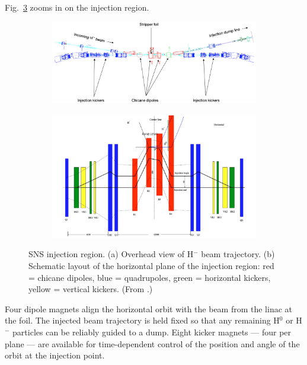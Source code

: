 Fig.~\ref{fig:SNS_injection_region} zooms in on the injection region.
%
\begin{figure}[!p]
    \centering
    \begin{subfigure}{\textwidth}
        \includegraphics[width=\textwidth]{Images/chapter1/SNS_injection_region1.png}
        \label{fig:SNS_injection_region_a}
        \caption{}
    \end{subfigure}
    \vfill
    \vspace*{1.5cm}
    \vfill
    \begin{subfigure}{\textwidth}
        \centering
        \includegraphics[width=\textwidth]{Images/chapter1/SNS_injection_region_2b.png}
        \caption{}
        \label{fig:SNS_injection_region_b}
    \end{subfigure}
    \caption{SNS injection region. (a) Overhead view of H$^-$ beam trajectory. (b) Schematic layout of the horizontal plane of the injection region: red = chicane dipoles, blue = quadrupoles, green = horizontal kickers, yellow = vertical kickers. (From \cite{Henderson2014}.)}
    \label{fig:SNS_injection_region}
\end{figure}
%
Four dipole magnets align the horizontal orbit with the beam from the linac at the foil. The injected beam trajectory is held fixed so that any remaining H$^0$ or H$^-$ particles can be reliably guided to a dump. Eight kicker magnets — four per plane — are available for time-dependent control of the position and angle of the orbit at the injection point. 


